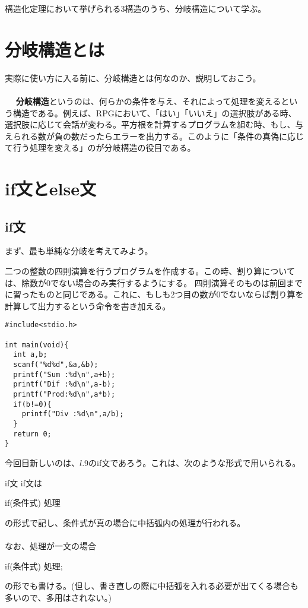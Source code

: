 構造化定理において挙げられる3構造のうち、分岐構造について学ぶ。
\section{分岐構造とは}
実際に使い方に入る前に、分岐構造とは何なのか、説明しておこう。
\\ \\　
\textbf{分岐構造}というのは、何らかの条件を与え、それによって処理を変えるという構造である。例えば、RPGにおいて、「はい」「いいえ」の選択肢がある時、選択肢に応じて会話が変わる。平方根を計算するプログラムを組む時、もし、与えられる数が負の数だったらエラーを出力する。このように「条件の真偽に応じて行う処理を変える」のが分岐構造の役目である。

\section{if文とelse文}
\subsection{if文}
まず、最も単純な分岐を考えてみよう。
\begin{boxnote}
\begin{multicols}{2}
二つの整数の四則演算を行うプログラムを作成する。この時、割り算については、除数が0でない場合のみ実行するようにする。
四則演算そのものは前回までに習ったものと同じである。これに、もしも2つ目の数が0でないならば割り算を計算して出力するという命令を書き加える。
\begin{lstlisting}[caption=0割回避四則演算,label=program4_1]
#include<stdio.h>

int main(void){
  int a,b;
  scanf("%d%d",&a,&b);
  printf("Sum :%d\n",a+b);
  printf("Dif :%d\n",a-b);
  printf("Prod:%d\n",a*b);
  if(b!=0){
    printf("Div :%d\n",a/b);
  }
  return 0;
}
\end{lstlisting}
\end{multicols}
\end{boxnote}
今回目新しいのは、$l$.9のif文であろう。これは、次のような形式で用いられる。
\begin{itembox}[l]{if文}
if文は
\begin{code}
if(条件式){
  処理
}
\end{code}
の形式で記し、条件式が真の場合に中括弧内の処理が行われる。
\\ \\
なお、処理が一文の場合
\begin{code}
if(条件式) 処理;
\end{code}
の形でも書ける。(但し、書き直しの際に中括弧を入れる必要が出てくる場合も多いので、多用はされない。)

\end{itembox}

